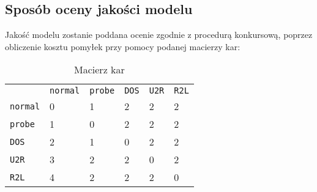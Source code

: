 \documentclass[a4paper, 12pt]{article}
\begin{document}
\subsection{Sposób oceny jakości modelu}
Jakość modelu zostanie poddana ocenie zgodnie z procedurą konkursową,
poprzez obliczenie kosztu pomyłek przy pomocy podanej macierzy kar:

\begin{table}[H]
\centering
\begin{tabular}{ l l l l l l }
       & \texttt{normal}&\texttt{probe}	&\texttt{DOS}	&\texttt{U2R}	&\texttt{R2L} \\
\texttt{normal}	&0	&1	&2	&2	&2 \\
\texttt{probe}	&1	&0	&2	&2	&2 \\
\texttt{DOS}	&2	&1	&0	&2	&2 \\
\texttt{U2R}	&3	&2	&2	&0	&2 \\
\texttt{R2L}	&4	&2	&2	&2	&0 \\
\end{tabular}
\caption{Macierz kar}
\label{table:cov_matrix}
\end{table}

\end{document}
